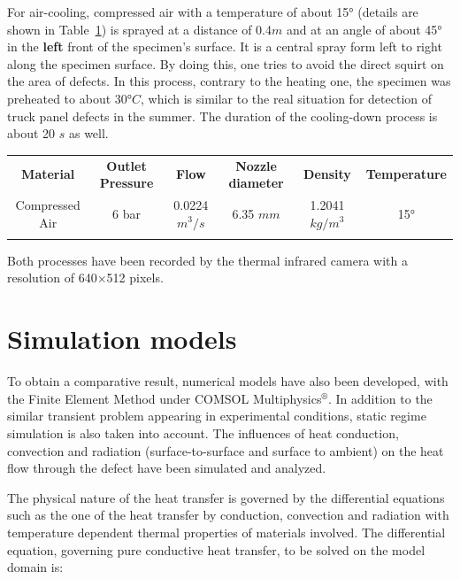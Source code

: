 \documentclass{tQRT2e}
\begin{document}
For air-cooling, compressed air with a temperature of about 15° (details are shown in Table~\ref{air_cool}) is sprayed at a distance of 0.4$ m $ and at an angle of about 45° in the \textbf{left} front of the specimen’s surface. It is a central spray form left to right along the specimen surface. By doing this, one tries to avoid the direct squirt on the area of defects. In this process, contrary to the heating one, the specimen was preheated to about 30$ °C $, which is similar to the real situation for detection of truck panel defects in the summer. The duration of the cooling-down process is about 20 $ s $ as well.   
 \begin{table}
 {\begin{tabular}[l]{@{}cccccc}\toprule
   \textbf{Material} & \textbf{Outlet Pressure} & \textbf{Flow}
          & \textbf{Nozzle diameter}
          & \textbf{Density} & \textbf{Temperature} \\
 \colrule
   Compressed Air & 6 bar & 0.0224 $m^3/s$ & 6.35 $mm$ & 1.2041 $kg/m^3$ & 15° \\
 \botrule
 \end{tabular}}
 \label{air_cool}
 \end{table}
Both processes have been recorded by the thermal infrared camera with a resolution of 640$\times$512 pixels.  

\section{Simulation models}
To obtain a comparative result, numerical models have also been developed, with the Finite Element Method under COMSOL Multiphysics$^{®}$. In addition to the similar transient problem appearing in experimental conditions, static regime simulation is also taken into account. The influences of heat conduction, convection and radiation (surface-to-surface and surface to ambient) on the heat flow through the defect have been simulated and analyzed.

The physical nature of the heat transfer is governed by the differential equations such as the one of the heat transfer by conduction, convection and radiation with temperature dependent thermal properties of materials involved. The differential equation, governing pure conductive heat transfer, to be solved on the model domain is: 
\end{document}
